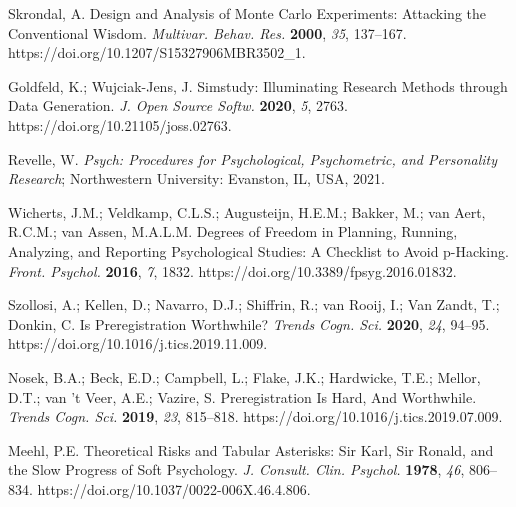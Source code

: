 \documentclass[psych,tutorial,accept,moreauthors,pdftex]{Definitions/mdpi}
\begin{document}
\begin{thebibliography}{999}
Skrondal, A. Design and Analysis of Monte Carlo Experiments: Attacking the Conventional Wisdom. \emph{Multivar. Behav. Res.} \textbf{2000}, \emph{35}, 137--167. https://doi.org/10.1207/S15327906MBR3502\_1.


Goldfeld, K.; Wujciak-Jens, J. Simstudy: Illuminating Research Methods through Data Generation. \emph{J. Open Source Softw.} \textbf{2020}, \emph{5}, 2763. https://doi.org/10.21105/joss.02763.

Revelle, W. \emph{Psych: Procedures for Psychological, Psychometric, and Personality Research}; Northwestern University: Evanston, IL, USA, 2021.

Wicherts, J.M.; Veldkamp, C.L.S.; Augusteijn, H.E.M.; Bakker, M.; van Aert, R.C.M.; van Assen, M.A.L.M. Degrees of Freedom in Planning, Running, Analyzing, and Reporting Psychological Studies: A Checklist to Avoid p-Hacking. \emph{Front. Psychol.} \textbf{2016}, \emph{7}, 1832. https://doi.org/10.3389/fpsyg.2016.01832.

Szollosi, A.; Kellen, D.; Navarro, D.J.; Shiffrin, R.; van Rooij, I.; Van Zandt, T.; Donkin, C. Is Preregistration Worthwhile? \emph{Trends Cogn. Sci.} \textbf{2020}, \emph{24}, 94--95. https://doi.org/10.1016/j.tics.2019.11.009.


Nosek, B.A.; Beck, E.D.; Campbell, L.; Flake, J.K.; Hardwicke, T.E.; Mellor, D.T.; van ’t Veer, A.E.; Vazire, S. Preregistration Is Hard, And Worthwhile. \emph{Trends Cogn. Sci.} \textbf{2019}, \emph{23}, 815--818. https://doi.org/10.1016/j.tics.2019.07.009.


Meehl, P.E. Theoretical Risks and Tabular Asterisks: Sir Karl, Sir Ronald, and the Slow Progress of Soft Psychology. \emph{J. Consult. Clin. Psychol.} \textbf{1978}, \emph{46}, 806--834. https://doi.org/10.1037/0022-006X.46.4.806.



\end{thebibliography}
\end{document}
